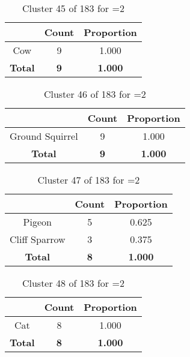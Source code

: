 \begin{table}[ht!]
\centering
\begin{tabular}{|c|c|c|}
\hline
\bf \Spec{} &\bf Count &\bf Proportion\\ \hline \hline
Cow & 9 & 1.000\\ \hline
\hline
\bf Total & \bf 9 & \bf 1.000\\ \hline
\end{tabular}
\label{tab:cluster:45:2}
\caption{Cluster 45 of 183 for \minneigh{}=2}
\end{table}

\begin{table}[ht!]
\centering
\begin{tabular}{|c|c|c|}
\hline
\bf \Spec{} &\bf Count &\bf Proportion\\ \hline \hline
Ground Squirrel & 9 & 1.000\\ \hline
\hline
\bf Total & \bf 9 & \bf 1.000\\ \hline
\end{tabular}
\label{tab:cluster:46:2}
\caption{Cluster 46 of 183 for \minneigh{}=2}
\end{table}

\begin{table}[ht!]
\centering
\begin{tabular}{|c|c|c|}
\hline
\bf \Spec{} &\bf Count &\bf Proportion\\ \hline \hline
Pigeon & 5 & 0.625\\ \hline
Cliff Sparrow & 3 & 0.375\\ \hline
\hline
\bf Total & \bf 8 & \bf 1.000\\ \hline
\end{tabular}
\label{tab:cluster:47:2}
\caption{Cluster 47 of 183 for \minneigh{}=2}
\end{table}

\begin{table}[ht!]
\centering
\begin{tabular}{|c|c|c|}
\hline
\bf \Spec{} &\bf Count &\bf Proportion\\ \hline \hline
Cat & 8 & 1.000\\ \hline
\hline
\bf Total & \bf 8 & \bf 1.000\\ \hline
\end{tabular}
\label{tab:cluster:48:2}
\caption{Cluster 48 of 183 for \minneigh{}=2}
\end{table}

